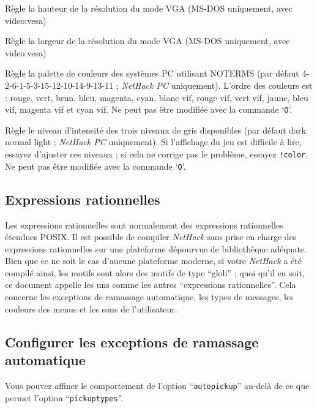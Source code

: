 \documentclass[titlepage]{article}
\begin{document}
\begin{description}[font=\mdseries\itshape]
Règle la hauteur de la résolution du mode VGA (MS-DOS uniquement, avec video:vesa)
\item[video\textunderscore width]
Règle la largeur de la résolution du mode VGA (MS-DOS uniquement, avec video:vesa)
\item[videocolors]
\begin{sloppypar}
Règle la palette de couleurs des systèmes PC utilisant NO\textunderscore TERMS
(par défaut 4-2-6-1-5-3-15-12-10-14-9-13-11 ; \textit{NetHack PC} uniquement).
L'ordre des couleurs est : rouge, vert, brun, bleu, magenta, cyan,
blanc vif, rouge vif, vert vif, jaune, bleu vif,
magenta vif et cyan vif.
Ne peut pas être modifiée avec la commande `\texttt{O}'.
\end{sloppypar}
\item[videoshades]
Règle le niveau d'intensité des trois niveaux de gris disponibles
(par défaut dark normal light ; \textit{NetHack PC} uniquement).
Si l'affichage du jeu est difficile à lire, essayez d'ajuster ces niveaux ;
si cela ne corrige pas le problème, essayez \texttt{!color}.
Ne peut pas être modifiée avec la commande `\texttt{O}'.
\end{description}

\subsection*{Expressions rationnelles}

Les expressions rationnelles sont normalement des expressions rationnelles
étendues POSIX. Il est possible de compiler \textit{NetHack} sans prise en charge des
expressions rationnelles sur
une plateforme dépourvue de bibliothèque adéquate.
Bien que ce ne soit le cas d'aucune plateforme moderne, si votre \textit{NetHack} a été
compilé ainsi, les motifs sont alors des motifs de type ``glob'' ; quoi qu'il en
soit, ce document appelle les uns comme les autres ``expressions rationnelles''.
Cela concerne les exceptions de ramassage automatique, les types de messages,
les couleurs des menus et les sons de l'utilisateur.

\subsection*{Configurer les exceptions de ramassage automatique}

Vous pouvez affiner le comportement de l'option ``\texttt{autopickup}''
au-delà de ce que permet l'option ``\texttt{pickup\textunderscore types}''.
\end{document}
